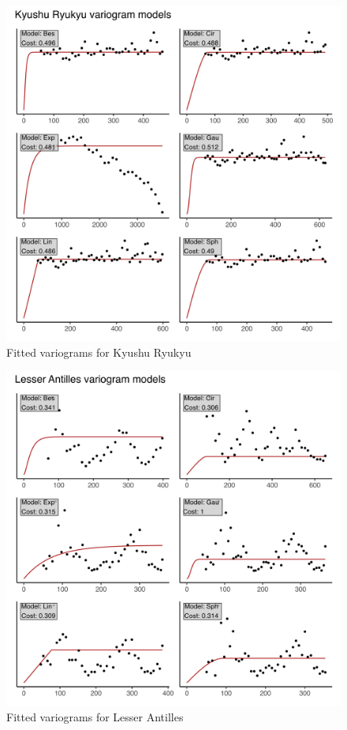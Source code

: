 \begin{figure}
\centering
\includegraphics{assets/figs/chpt3/KyushuRyukyuVgrms.png}
\caption[Fitted variograms for Kyushu Ryukyu]{Fitted variograms for Kyushu Ryukyu}
\end{figure}

\begin{figure}
\centering
\includegraphics{assets/figs/chpt3/LesserAntillesVgrms.png}
\caption[Fitted variograms for Lesser Antilles]{Fitted variograms for Lesser Antilles}
\end{figure}

